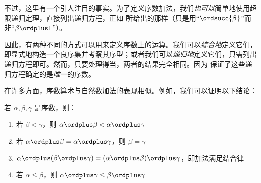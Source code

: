 \documentclass[../../../include/open-logic-section]{subfiles}
\begin{document}
不过，这里有一个引人注目的事实。为了定义序数加法，我们\emph{也可以}简单地使用超限递归定理，直接列出递归方程，正如  所给出的那样（只是用“$\ordsucc{\beta}$”而非“$\beta \ordplus 1$”）。

因此，有两种不同的方式可以用来定义序数上的运算。我们可以\emph{综合地}定义它们，即显式地构造一个良序集并考察其序型；或者我们可以\emph{递归地}定义它们，只需列出递归方程即可。然而，只要处理得当，两者的结果完全相同。因为  保证了这些递归方程确定的是\emph{唯一}的序数。

在许多方面，序数算术与自然数加法的表现相似。例如，我们可以证明以下结论：

\begin{lem}
若 $\alpha, \beta, \gamma$ 是序数，则：
\begin{enumerate}
	\item{} 若 $\beta < \gamma$，则 $\alpha
	\ordplus  \beta < \alpha \ordplus  \gamma$
	\item{} 若 $\alpha \ordplus  \beta =
	\alpha\ordplus \gamma$，则 $\beta = \gamma$
	\item{}  $\alpha \ordplus  (\beta \ordplus
	\gamma) = (\alpha \ordplus  \beta) \ordplus  \gamma$，即加法满足结合律
	\item{}  若 $\alpha \leq \beta$，则 $\alpha
	\ordplus  \gamma \leq \beta \ordplus \gamma$
\end{enumerate}
\end{lem}
\end{document}
